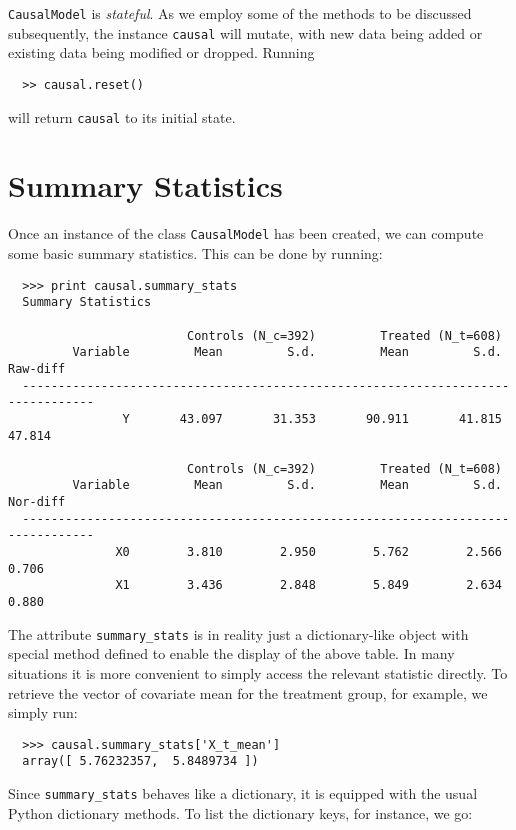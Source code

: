 \documentclass[12pt]{article}
\theoremstyle{definition}
\theoremstyle{definition}
\theoremstyle{definition}
\theoremstyle{remark}
\begin{document}
\texttt{CausalModel} is \textit{stateful}. As we employ some of the methods to be discussed subsequently, the instance \texttt{causal} will mutate, with new data being added or existing data being modified or dropped. Running

\begin{verbatim}
  >> causal.reset()
\end{verbatim}

will return \texttt{causal} to its initial state.

\section*{Summary Statistics}

Once an instance of the class \texttt{CausalModel} has been created, we can compute some basic summary statistics. This can be done by running:

\begin{verbatim}
  >>> print causal.summary_stats
  Summary Statistics
  
                         Controls (N_c=392)         Treated (N_t=608)             
         Variable         Mean         S.d.         Mean         S.d.     Raw-diff
  --------------------------------------------------------------------------------
                Y       43.097       31.353       90.911       41.815       47.814
  
                         Controls (N_c=392)         Treated (N_t=608)             
         Variable         Mean         S.d.         Mean         S.d.     Nor-diff
  --------------------------------------------------------------------------------
               X0        3.810        2.950        5.762        2.566        0.706
               X1        3.436        2.848        5.849        2.634        0.880
\end{verbatim}

The attribute \texttt{summary\_stats} is in reality just a dictionary-like object with special method defined to enable the display of the above table. In many situations it is more convenient to simply access the relevant statistic directly. To retrieve the vector of covariate mean for the treatment group, for example, we simply run:

\begin{verbatim}
  >>> causal.summary_stats['X_t_mean']
  array([ 5.76232357,  5.8489734 ])
\end{verbatim}

Since \texttt{summary\_stats} behaves like a dictionary, it is equipped with the usual Python dictionary methods. To list the dictionary keys, for instance, we go:
\end{document}
